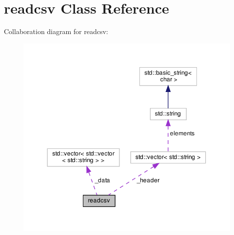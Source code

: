 \hypertarget{classreadcsv}{}\section{readcsv Class Reference}
\label{classreadcsv}


Collaboration diagram for readcsv\+:\nopagebreak
\begin{figure}[H]
\begin{center}
\leavevmode
\includegraphics[width=344pt]{classreadcsv__coll__graph}
\end{center}
\end{figure}
